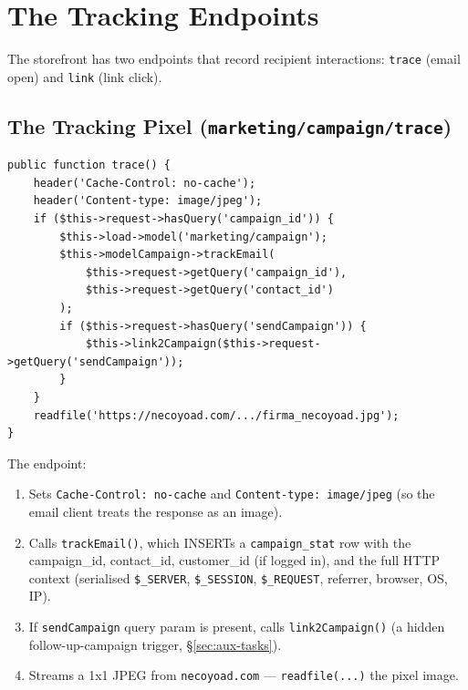 \documentclass[11pt,a4paper]{article}
\begin{document}
\section{The Tracking Endpoints}\label{sec:tracking}

The storefront has two endpoints that record recipient
interactions: \texttt{trace} (email open) and \texttt{link} (link
click).

\subsection{The Tracking Pixel (\texttt{marketing/campaign/trace})}

\begin{lstlisting}[caption={\texttt{ControllerMarketingCampaign::trace()} --- the open-tracking pixel.},label={lst:trace}]
public function trace() {
    header('Cache-Control: no-cache');
    header('Content-type: image/jpeg');
    if ($this->request->hasQuery('campaign_id')) {
        $this->load->model('marketing/campaign');
        $this->modelCampaign->trackEmail(
            $this->request->getQuery('campaign_id'),
            $this->request->getQuery('contact_id')
        );
        if ($this->request->hasQuery('sendCampaign')) {
            $this->link2Campaign($this->request->getQuery('sendCampaign'));
        }
    }
    readfile('https://necoyoad.com/.../firma_necoyoad.jpg');
}
\end{lstlisting}

The endpoint:

\begin{enumerate}[leftmargin=1.6em,itemsep=2pt]
  \item Sets \texttt{Cache-Control: no-cache} and
        \texttt{Content-type: image/jpeg} (so the email client
        treats the response as an image).
  \item Calls \texttt{trackEmail()}, which INSERTs a
        \texttt{campaign\_stat} row with the campaign\_id,
        contact\_id, customer\_id (if logged in), and the full
        HTTP context (serialised \texttt{\$\_SERVER},
        \texttt{\$\_SESSION}, \texttt{\$\_REQUEST}, referrer,
        browser, OS, IP).
  \item If \texttt{sendCampaign} query param is present, calls
        \texttt{link2Campaign()} (a hidden follow-up-campaign
        trigger, \S\ref{sec:aux-tasks}).
  \item Streams a 1x1 JPEG from \texttt{necoyoad.com} ---
        \texttt{readfile(...)} the pixel image.
\end{enumerate}
\end{document}
